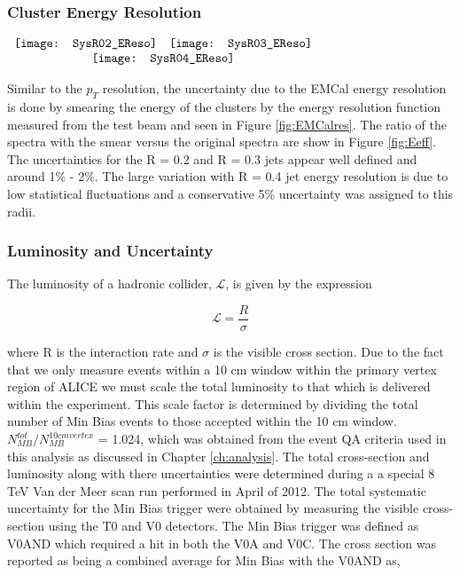 \subsubsection{Cluster Energy Resolution}

\begin{figure*}[t!]
$\begin{array}{rl}
    \texttt{[image: SysR02\_EReso]} &
    \texttt{[image: SysR03\_EReso]}\\
    \multicolumn{2}{c}{\texttt{[image: SysR04\_EReso]}}
\end{array}$
\caption[Systematic due to energy resolution.]{\label{fig:Eeff}Systematic due to the energy resolution; R = 0.2 \textit{(top left)}, R = 0.3 \textit{(top right)}, R = 0.4 \textit{(bottom)}.}
\end{figure*}

Similar to the $p_{T}$ resolution, the uncertainty due to the EMCal energy resolution is done by smearing the energy of the clusters by the energy resolution function measured from the test beam and seen in Figure \ref{fig:EMCalres}.  The ratio of the spectra with the smear versus the original spectra are show in Figure \ref{fig:Eeff}. The uncertainties for the R = 0.2 and R = 0.3 jets appear well defined and around 1\% - 2\%.  The large variation with R = 0.4 jet energy resolution is due to low statistical fluctuations and a conservative 5\% uncertainty was assigned to this radii.

\subsubsection{Luminosity and Uncertainty}

The luminosity of a hadronic collider, $\mathscr{L}$, is given by the expression



\begin{equation}
\mathscr{L} = \frac{R}{\sigma}
\label{eq:xlumdef}
\end{equation}

\noindent
where R is the interaction rate and $\sigma$ is the visible cross section.  Due to the fact that we only measure events within a 10 cm window within the primary vertex region of ALICE we must scale the total luminosity to that which is delivered within the experiment.  This scale factor is determined by dividing the total number of Min Bias events to those accepted within the 10 cm window.  $N^{tot}_{MB} / N^{10 cm vertex}_{MB}$ = 1.024, which was obtained from the event QA criteria used in this analysis as discussed in Chapter \ref{ch:analysis}.
The total cross-section and luminosity along with there uncertainties were determined during a a special 8 TeV Van der Meer scan run performed in April of 2012\cite{ALICE-PUBLIC-2017-002}.  The total systematic uncertainty for the Min Bias trigger were obtained by measuring the visible cross-section using the T0 and V0 detectors.  The Min Bias trigger was defined as V0AND which required a hit in both the V0A and V0C.  The cross section was reported as being a combined average for Min Bias with the V0AND as, 

